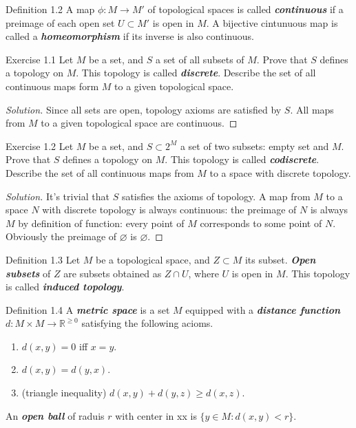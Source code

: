 \begin{thing3}{Definition 1.2}\leavevmode
	A map $\phi:M\to M'$ of topological spaces is called \textit{\textbf{continuous}} if a preimage of each open set $U \subset M'$ is open in $M$. A bijective cintunuous map is called a \textit{\textbf{homeomorphism}} if its inverse is also continuous.
\end{thing3}

\begin{thing4}{Exercise 1.1}\leavevmode
	Let $M$ be a set, and $S$ a set of all subsets of $M$. Prove that $S$ defines a topology on $M$. This topology is called \textit{\textbf{discrete}}. Describe the set of all continuous maps form $M$ to a given topological space.
\end{thing4}

\begin{proof}[Solution]\leavevmode
Since all sets are open, topology axioms are satisfied by $S$. All maps from $M$ to a given topological space are continuous.
\end{proof}

\begin{thing4}{Exercise 1.2}\leavevmode
	Let $M$ be a set, and $S \subset 2^M$ a set of two subsets: empty set and $M$. Prove that $S$ defines a topology on $M$. This topology is called \textit{\textbf{codiscrete}}. Describe the set of all continuous maps from $M$ to a space with discrete topology.
\end{thing4}

\begin{proof}[Solution]\leavevmode
It's trivial that $S$ satisfies the axioms of topology. A map from $M$ to a space $N$ with discrete topology is always continuous: the preimage of $N$ is always $M$ by definition of function: every point of $M$ corresponds to some point of $N$. Obviously the preimage of $\varnothing$ is $\varnothing$.
\end{proof}

\begin{thing3}{Definition 1.3}\leavevmode
	Let $M$ be a topological space, and $Z \subset M$ its subset. \textit{\textbf{Open subsets}} of $Z$ are subsets obtained as $Z \cap U$, where $U$ is open in $M$. This topology is called \textit{\textbf{induced topology}}.
\end{thing3}

\begin{thing3}{Definition 1.4}\leavevmode
	A \textit{\textbf{metric space}} is a set $M$ equipped with a \textit{\textbf{distance function}} $d: M \times M \longrightarrow \mathbb{R}^{\geq 0}$ satisfying the following acioms.
	\begin{enumerate}
	\item $d(x,y)=0$ iff $x=y$.
	\item $d(x,y)=d(y,x)$.
	\item (triangle inequality) $d(x,y)+d(y,z) \geq d(x,z)$.
	\end{enumerate}
An \textit{\textbf{open ball}} of raduis $r$ with center in xx is $\{y \in M: d(x,y)<r\}$.
\end{thing3}

